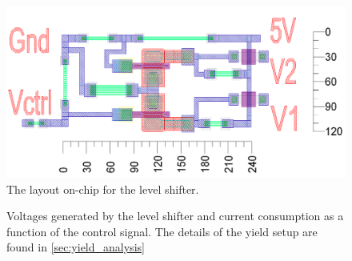 		
		\begin{figure}[h!]
			\centering
			\includegraphics[width=1.0\textwidth]{fig/attenuators/level_shifter_layout}
			\caption[Level shifter layout]{The layout on-chip for the level shifter.}\label{fig:level_shifter_layout}
		\end{figure}


	\begin{figure}[h!]
			\centering 
			\caption[Level shifter output]{ Voltages generated by the level shifter and  current consumption as a function of the control signal. The details of the yield setup are found in \autoref{sec:yield_analysis}}\label{fig:level_shifter_data}
		\end{figure}

		
		






